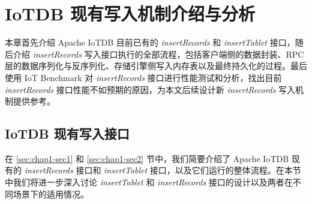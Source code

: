 
\chapter{IoTDB 现有写入机制介绍与分析}
本章首先介绍 Apache IoTDB 目前已有的 \emph{insertRecords} 和 \emph{insertTablet} 接口，随后介绍 \emph{insertRecords} 写入接口执行的全部流程，包括客户端侧的数据封装、RPC 层的数据序列化与反序列化、存储引擎侧写入内存表以及最终持久化的过程。最后使用 IoT Benchmark 对 \emph{insertRecords} 接口进行性能测试和分析，找出目前 \emph{insertRecords} 接口性能不如预期的原因，为本文后续设计新 \emph{insertRecords} 写入机制提供参考。
\section{IoTDB 现有写入接口}
在 \ref{sec:chap1-sec1} 和 \ref{sec:chap1-sec2} 节中，我们简要介绍了 Apache IoTDB 现有的 \emph{insertRecords} 接口和 \emph{insertTablet} 接口，以及它们运行的整体流程。在本节中我们将进一步深入讨论 \emph{insertTablet} 和 \emph{insertRecords} 接口的设计以及两者在不同场景下的适用情况。

